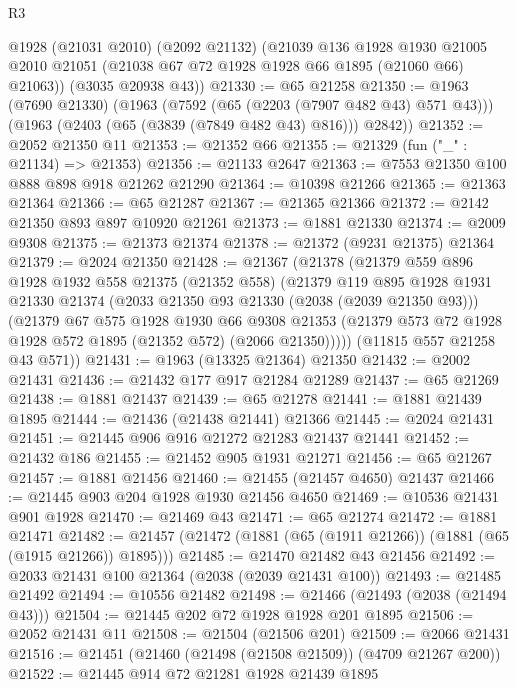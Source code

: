 \begin{lexlean}{R3}
\begin{coremodule}
      @1928
      (@21031 @2010)
      (@2092 @21132)
      (@21039
        @136
        @1928
        @1930
        @21005
        @2010
        @21051
        (@21038 @67 @72 @1928 @1928 @66 @1895 (@21060 @66) @21063))
      (@3035 @20938 @43))
@21330 := @65 @21258
@21350 := @1963
    (@7690 @21330)
    (@1963
      (@7592 (@65 (@2203 (@7907 @482 @43) @571 @43)))
      (@1963 (@2403 (@65 (@3839 (@7849 @482 @43) @816))) @2842))
@21352 := @2052 @21350 @11
@21353 := @21352 @66
@21355 := @21329 (fun ("_" : @21134) => @21353)
@21356 := @21133 @2647
@21363 := @7553 @21350 @100 @888 @898 @918 @21262 @21290
@21364 := @10398 @21266
@21365 := @21363 @21364
@21366 := @65 @21287
@21367 := @21365 @21366
@21372 := @2142 @21350 @893 @897 @10920 @21261
@21373 := @1881 @21330
@21374 := @2009 @9308
@21375 := @21373 @21374
@21378 := @21372 (@9231 @21375) @21364
@21379 := @2024 @21350
@21428 := @21367
    (@21378
      (@21379
        @559
        @896
        @1928
        @1932
        @558
        @21375
        (@21352 @558)
        (@21379
          @119
          @895
          @1928
          @1931
          @21330
          @21374
          (@2033 @21350 @93 @21330 (@2038 (@2039 @21350 @93)))
          (@21379
            @67
            @575
            @1928
            @1930
            @66
            @9308
            @21353
            (@21379 @573 @72 @1928 @1928 @572 @1895 (@21352 @572) (@2066 @21350)))))
      (@11815 @557 @21258 @43 @571))
@21431 := @1963 (@13325 @21364) @21350
@21432 := @2002 @21431
@21436 := @21432 @177 @917 @21284 @21289
@21437 := @65 @21269
@21438 := @1881 @21437
@21439 := @65 @21278
@21441 := @1881 @21439 @1895
@21444 := @21436 (@21438 @21441) @21366
@21445 := @2024 @21431
@21451 := @21445 @906 @916 @21272 @21283 @21437 @21441
@21452 := @21432 @186
@21455 := @21452 @905 @1931 @21271
@21456 := @65 @21267
@21457 := @1881 @21456
@21460 := @21455 (@21457 @4650) @21437
@21466 := @21445 @903 @204 @1928 @1930 @21456 @4650
@21469 := @10536 @21431 @901 @1928
@21470 := @21469 @43
@21471 := @65 @21274
@21472 := @1881 @21471
@21482 := @21457 (@21472 (@1881 (@65 (@1911 @21266)) (@1881 (@65 (@1915 @21266)) @1895)))
@21485 := @21470 @21482 @43 @21456
@21492 := @2033 @21431 @100 @21364 (@2038 (@2039 @21431 @100))
@21493 := @21485 @21492
@21494 := @10556 @21482
@21498 := @21466 (@21493 (@2038 (@21494 @43)))
@21504 := @21445 @202 @72 @1928 @1928 @201 @1895
@21506 := @2052 @21431 @11
@21508 := @21504 (@21506 @201)
@21509 := @2066 @21431
@21516 := @21451 (@21460 (@21498 (@21508 @21509)) (@4709 @21267 @200))
@21522 := @21445 @914 @72 @21281 @1928 @21439 @1895

\end{coremodule}
\end{lexlean}
